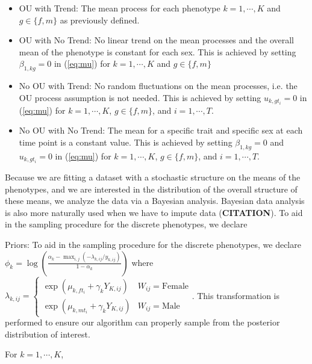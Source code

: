 \documentclass[
  12pt,
]{article}
\begin{document}
\begin{itemize}
\item OU with Trend: The mean process for each phenotype $k=1,\cdots,K$ and $g \in \{f,m\}$ as previously defined.
\item OU with No Trend: No linear trend on the mean processes and the overall mean of the phenotype is constant for each sex. This is achieved by setting $\beta_{1,kg} = 0$ in (\ref{eq:mu}) for $k = 1,\cdots,K$ and $g \in \{f,m\}$
\item No OU with Trend: No random fluctuations on the mean processes, i.e. the OU process assumption is not needed. This is achieved by setting $u_{k,gt_i} = 0$ in (\ref{eq:mu}) for $k = 1,\cdots,K$, $g \in \{f,m\}$, and $i = 1,\cdots,T$.
\item No OU with No Trend: The mean for a specific trait and specific sex at each time point is a constant value. This is achieved by setting $\beta_{1,kg} = 0$ and $u_{k,gt_i} = 0$ in (\ref{eq:mu}) for $k = 1,\cdots,K$, $g \in \{f,m\}$, and $i = 1,\cdots,T$.
\end{itemize}

Because we are fitting a dataset with a stochastic structure on the
means of the phenotypes, and we are interested in the distribution of
the overall structure of these means, we analyze the data via a Bayesian
analysis. Bayesian data analysis is also more naturally used when we
have to impute data (\textbf{CITATION}). To aid in the sampling
procedure for the discrete phenotypes, we declare

Priors: To aid in the sampling procedure for the discrete phenotypes, we
declare
\(\phi_k = \log\left(\frac{\alpha_k - \max_{i,j}(-\lambda_{k,ij}/y_{k,ij})}{1 - \alpha_k}\right)\)
where
\(\lambda_{k,ij} = \left\{\begin{array}{cc} \exp(\mu_{k,ft_i} + \gamma_k Y_{K,ij}) & W_{ij} = \text{Female} \\ \exp(\mu_{k,mt_i} + \gamma_k Y_{K,ij}) & W_{ij} = \text{Male} \end{array}\right.\).
This transformation is performed to ensure our algorithm can properly
sample from the posterior distribution of interest.

For \(k = 1,\cdots,K\),
\end{document}
